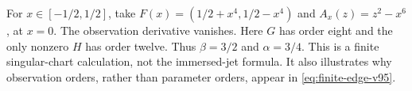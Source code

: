 \begin{example}\label{ex:singular-edge-v95}
For $x\in[-1/2,1/2]$, take
$F(x)=(1/2+x^4,1/2-x^4)$ and $A_x(z)=z^2-x^6$, at $x=0$.
The observation derivative vanishes. Here $G$ has order eight and the
only nonzero $H$ has order twelve. Thus $\beta=3/2$ and $\alpha=3/4$.
This is a finite singular-chart calculation, not the immersed-jet
formula. It also illustrates why observation orders, rather than
parameter orders, appear in \eqref{eq:finite-edge-v95}.
\end{example}
